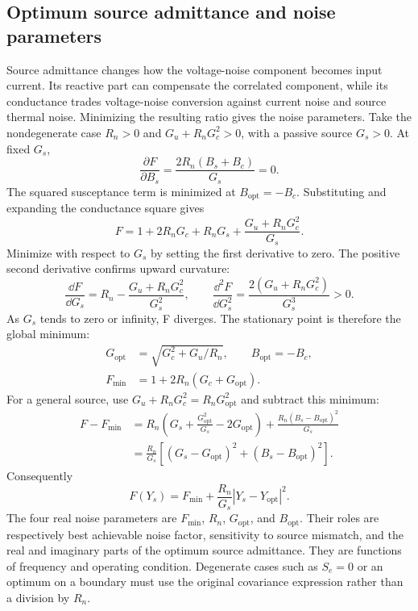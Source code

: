 \subsection{Optimum source admittance and noise parameters}
\label{sec:noise-optimum}
Source admittance changes how the voltage-noise component becomes input current. Its reactive part can compensate the correlated component, while its conductance trades voltage-noise conversion against current noise and source thermal noise. Minimizing the resulting ratio gives the noise parameters.
Take the nondegenerate case $R_n>0$ and $G_u+R_nG_c^2>0$, with a passive source $G_s>0$. At fixed $G_s$,
\[
\frac{\partial F}{\partial B_s}=\frac{2R_n(B_s+B_c)}{G_s}=0.
\]
The squared susceptance term is minimized at $B_{\mathrm{opt}}=-B_c$. Substituting and expanding the conductance square gives
\[
F=1+2R_nG_c+R_nG_s+\frac{G_u+R_nG_c^2}{G_s}.
\]
Minimize with respect to $G_s$ by setting the first derivative to zero. The positive second derivative confirms upward curvature:
\[
\frac{\dd F}{\dd G_s}=R_n-\frac{G_u+R_nG_c^2}{G_s^2},\qquad
\frac{\dd^2F}{\dd G_s^2}=\frac{2(G_u+R_nG_c^2)}{G_s^3}>0.
\]
As $G_s$ tends to zero or infinity, F diverges. The stationary point is therefore the global minimum:
\begin{align}
G_{\mathrm{opt}}&=\sqrt{G_c^2+G_u/R_n},\qquad B_{\mathrm{opt}}=-B_c,\\
F_{\min}&=1+2R_n(G_c+G_{\mathrm{opt}}).
\end{align}
For a general source, use $G_u+R_nG_c^2=R_nG_{\mathrm{opt}}^2$ and subtract this minimum:
\begin{align*}
F-F_{\min}
&=R_n\left(G_s+\frac{G_{\mathrm{opt}}^2}{G_s}-2G_{\mathrm{opt}}\right)
+\frac{R_n(B_s-B_{\mathrm{opt}})^2}{G_s}\\
&=\frac{R_n}{G_s}[(G_s-G_{\mathrm{opt}})^2+(B_s-B_{\mathrm{opt}})^2].
\end{align*}
Consequently
\begin{equation}
\boxed{F(Y_s)=F_{\min}+\frac{R_n}{G_s}|Y_s-Y_{\mathrm{opt}}|^2.}
\label{eq:Fopt}
\end{equation}
The four real noise parameters are $F_{\min}$, $R_n$, $G_{\mathrm{opt}}$, and $B_{\mathrm{opt}}$. Their roles are respectively best achievable noise factor, sensitivity to source mismatch, and the real and imaginary parts of the optimum source admittance. They are functions of frequency and operating condition. Degenerate cases such as $S_e=0$ or an optimum on a boundary must use the original covariance expression rather than a division by $R_n$.

